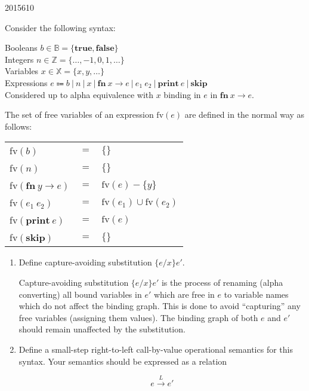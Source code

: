 \documentclass[10pt,\jkfside,a4paper]{article}
\begin{document}
\begin{examquestion}{2015}{6}{10}

Consider the following syntax:

Booleans $b \in \mathbb{B} = \{\mathbf{true}, \mathbf{false}\}$\\
Integers $n \in \mathbb{Z} = \{\dots, -1, 0, 1, \dots\}$\\
Variables $x \in \mathbb{X} = \{x, y, \dots\}$\\
Expressions $e \Coloneqq b \ | \ n \ | \ x \ | \ \mathbf{fn} \ x \to e \ |
 \ e_1 \ e_2 \ | \ \mathbf{print} \ e \ | \ \mathbf{skip}$\\
Considered up to alpha equivalence with $x$ binding in $e$ in $\mathbf{fn} \ x \to e$.

The set of free variables of an expression $\text{fv}(e)$ are defined in the
normal way as follows:

\begin{table}[H]
\centering
\begin{tabular}{l l l}
fv$(b)$ & $=$ & $\{\}$ \\
fv$(n)$ & $=$ & $\{\}$ \\
fv$(\mathbf{fn} \ y \to e)$ & $=$ & $\text{fv}(e) - \{y\}$ \\
fv$(e_1 \ e_2)$ & $=$ & $\text{fv}(e_1) \cup \text{fv}(e_2)$ \\
fv$(\mathbf{print} \ e)$ & $=$ & $\text{fv}(e)$ \\
fv$(\mathbf{skip})$ & $=$ & $\{\}$ \\
\end{tabular}
\end{table}

\begin{enumerate}[label=(\alph*)]

\item Define capture-avoiding substitution $\{e / x\}e'$.

Capture-avoiding substitution $\{e / x\}e'$ is the process of renaming
(alpha converting) all bound variables in $e'$ which are free in $e$ to
variable names which do not affect the binding graph. This is done to avoid
``capturing'' any free variables (assigning them values). The binding graph
of both $e$ and $e'$ should remain unaffected by the substitution.

\item Define a small-step right-to-left call-by-value operational semantics
for this syntax. Your semantics should be expressed as a relation

\[
e \stackrel{L}{\to} e'
\]


\end{enumerate}
\end{examquestion}
\end{document}
